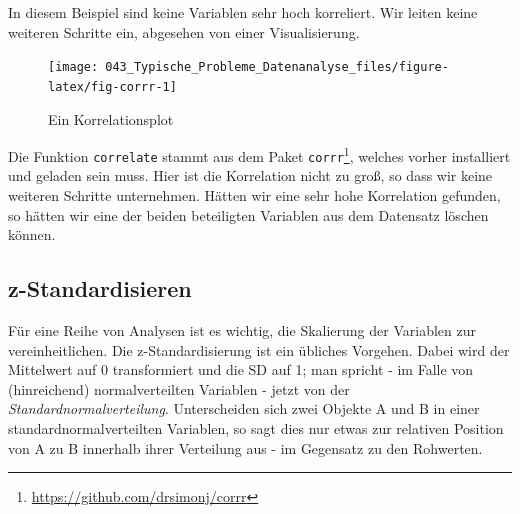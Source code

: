 \documentclass[12pt,ngerman,]{book}
\makeatletter
\newenvironment{Shaded}{\begin{snugshade}}{\end{snugshade}}
\newcommand{\KeywordTok}[1]{\textcolor[rgb]{0.13,0.29,0.53}{\textbf{#1}}}
\newcommand{\StringTok}[1]{\textcolor[rgb]{0.31,0.60,0.02}{#1}}
\newcommand{\CommentTok}[1]{\textcolor[rgb]{0.56,0.35,0.01}{\textit{#1}}}
\newcommand{\OperatorTok}[1]{\textcolor[rgb]{0.81,0.36,0.00}{\textbf{#1}}}
\newcommand{\NormalTok}[1]{#1}
\let\rmarkdownfootnote\footnote%
\def\footnote{\protect\rmarkdownfootnote}
\newenvironment{kframe}{%
\medskip{}
\setlength{\fboxsep}{.8em}
 \def\at@end@of@kframe{}%
 \ifinner\ifhmode%
  \def\at@end@of@kframe{\end{minipage}}%
  \begin{minipage}{\columnwidth}%
 \fi\fi%
 \def\FrameCommand##1{\hskip\@totalleftmargin \hskip-\fboxsep
 \colorbox{shadecolor}{##1}\hskip-\fboxsep
     \hskip-\linewidth \hskip-\@totalleftmargin \hskip\columnwidth}%
 \MakeFramed {\advance\hsize-\width
   \@totalleftmargin\z@ \linewidth\hsize
   \@setminipage}}%
 {\par\unskip\endMakeFramed%
 \at@end@of@kframe}
\renewenvironment{Shaded}{\begin{kframe}}{\end{kframe}}
\theoremstyle{definition}
\theoremstyle{definition}
\theoremstyle{remark}
\makeatother
\begin{document}
In diesem Beispiel sind keine Variablen sehr hoch korreliert. Wir leiten
keine weiteren Schritte ein, abgesehen von einer Visualisierung.

\begin{Shaded}
\end{Shaded}

\begin{figure}

{\centering \texttt{[image: 043\_Typische\_Probleme\_Datenanalyse\_files/figure-latex/fig-corrr-1]} 

}

\caption{Ein Korrelationsplot}\label{fig:fig-corrr}
\end{figure}

Die Funktion \texttt{correlate} stammt aus dem Paket
\texttt{corrr}\footnote{\url{https://github.com/drsimonj/corrr}},
welches vorher installiert und geladen sein muss. Hier ist die
Korrelation nicht zu groß, so dass wir keine weiteren Schritte
unternehmen. Hätten wir eine sehr hohe Korrelation gefunden, so hätten
wir eine der beiden beteiligten Variablen aus dem Datensatz löschen
können.

\subsection{z-Standardisieren}\label{z-standardisieren}

Für eine Reihe von Analysen ist es wichtig, die Skalierung der Variablen
zur vereinheitlichen. Die z-Standardisierung ist ein übliches Vorgehen.
Dabei wird der Mittelwert auf 0 transformiert und die SD auf 1; man
spricht - im Falle von (hinreichend) normalverteilten Variablen - jetzt
von der \emph{Standardnormalverteilung}.
Unterscheiden sich zwei Objekte A und B in einer
standardnormalverteilten Variablen, so sagt dies nur etwas zur relativen
Position von A zu B innerhalb ihrer Verteilung aus - im Gegensatz zu den
Rohwerten.

\begin{Shaded}
\end{Shaded}
\end{document}

